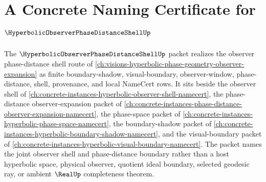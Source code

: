 \chapter{A Concrete Naming Certificate for $\HyperbolicObserverPhaseDistanceShellUp$}
\label{ch:concrete-instances-hyperbolic-observer-phase-distance-shell-namecert}

The $\HyperbolicObserverPhaseDistanceShellUp$ packet realizes the observer phase-distance shell route of \autoref{ch:visions-hyperbolic-phase-geometry-observer-expansion} as finite boundary-shadow, visual-boundary, observer-window, phase-distance, shell, provenance, and local NameCert rows. It sits beside the observer shell of \autoref{ch:concrete-instances-hyperbolic-observer-shell-namecert}, the phase-distance observer-expansion packet of \autoref{ch:concrete-instances-phase-distance-observer-expansion-namecert}, the phase-space packet of \autoref{ch:concrete-instances-hyperbolic-phase-space-namecert}, the boundary-shadow packet of \autoref{ch:concrete-instances-hyperbolic-boundary-shadow-namecert}, and the visual-boundary packet of \autoref{ch:concrete-instances-hyperbolic-visual-boundary-namecert}. The packet names the joint observer shell and phase-distance boundary rather than a host hyperbolic space, physical observer, quotient ideal boundary, selected geodesic ray, or ambient $\RealUp$ completeness theorem.

